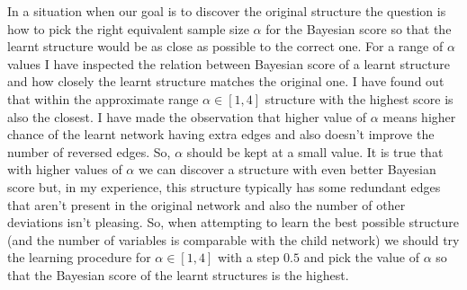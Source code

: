 \documentclass[english,cover]{fitthesis} %
\begin{document}
\medskip
In a situation when our goal is to discover the original structure the question is how to pick the right equivalent sample size $\alpha$ for the Bayesian score so that the learnt structure would be as close as possible to the correct one. For a range of $\alpha$ values I have inspected the relation between Bayesian score of a learnt structure and how closely the learnt structure matches the original one. I have found out that within the approximate range $\alpha \in [1,4]$ structure with the highest score is also the closest. 
I have made the observation that higher value of $\alpha$ means higher chance of the learnt network having extra edges and also doesn't improve the number of reversed edges. So, $\alpha$ should be kept at a small value.
It is true that with higher values of $\alpha$ we can discover a structure with even better Bayesian score but, in my experience, this structure typically has some redundant edges that aren't present in the original network and also the number of other deviations isn't pleasing. So, when attempting to learn the best possible structure (and the number of variables is comparable with the child network) we should try the learning procedure for $\alpha \in [1,4]$ with a step $0.5$ and pick the value of $\alpha$ so that the Bayesian score of the learnt structures is the highest.
\end{document}
